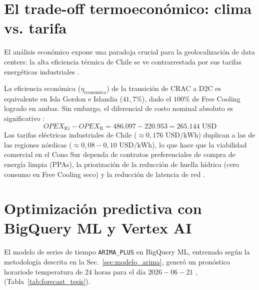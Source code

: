 \section{El trade-off termoecon\'omico: clima vs. tarifa}
El an\'alisis econ\'omico expone una paradoja crucial para la geolocalizaci\'on de data centers: la alta eficiencia t\'ermica de Chile se ve contrarrestada por sus tarifas energ\'eticas industriales \cite{bnef2024}.

La eficiencia econ\'omica ($\eta_{\text{economica}}$) de la transici\'on de CRAC a D2C es equivalente en Isla Gordon e Islandia ($41,7\%$), dado el $100\%$ de Free Cooling logrado en ambas. Sin embargo, el diferencial de costo nominal absoluto es significativo \cite{greenberg2006}:
\begin{equation}
OPEX_{\text{IG}} - OPEX_{\text{R}} = 486.097 - 220.953 = 265.144 \text{ USD}
\end{equation}
Las tarifas el\'ectricas industriales de Chile ($\approx 0,176\text{ USD/kWh}$) duplican a las de las regiones n\'ordicas ($\approx 0,08 - 0,10\text{ USD/kWh}$), lo que hace que la viabilidad comercial en el Cono Sur dependa de contratos preferenciales de compra de energ\'ia limpia (PPAs), la priorizaci\'on de la reducci\'on de huella h\'idrica (cero consumo en Free Cooling seco) y la reducci\'on de latencia de red \cite{bnef2024}.

\section{Optimizaci\'on predictiva con BigQuery ML y Vertex AI}
El modelo de series de tiempo \texttt{ARIMA\_PLUS} en BigQuery ML, entrenado seg\'un la metodolog\'ia descrita en la Sec.~\ref{sec:modelo_arima}, gener\'o un pron\'ostico horariode temperatura de $24\text{ horas}$ para el d\'ia $2026-06-21$ \cite{box2015}, \cite{google2023} (Tabla~\ref{tab:forecast_tesis}).

\begin{table}[htbp]
\caption{Resultados del Pron\'ostico de Temperatura (2026-06-21)}
\label{tab:forecast_tesis}
\centering
{}
\end{table}

